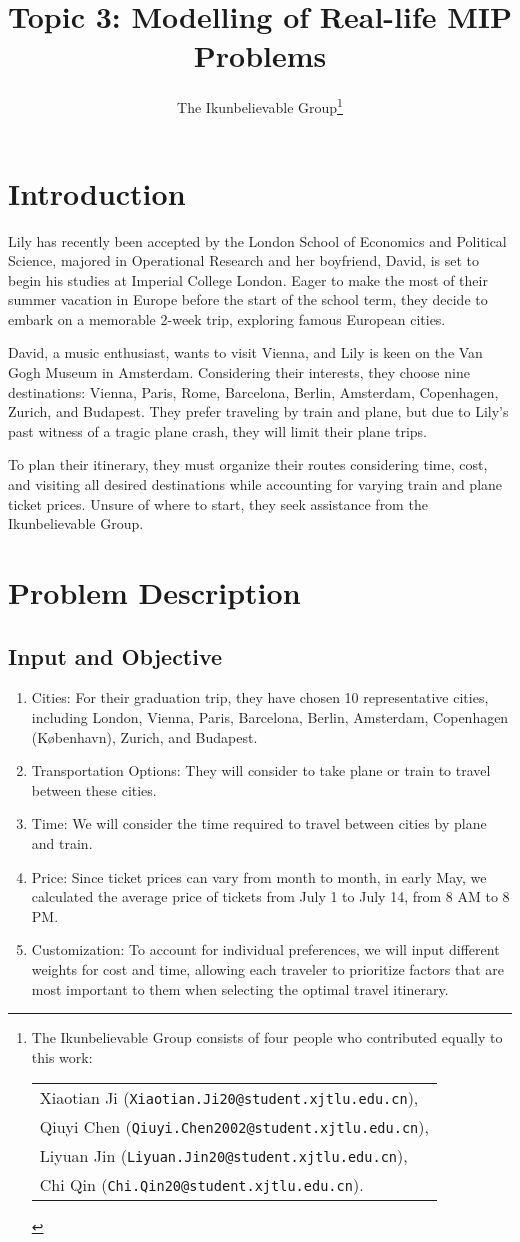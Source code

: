 \documentclass{article} %
\title{Topic 3: Modelling of Real-life MIP Problems}
\author{The Ikunbelievable Group\thanks{ The Ikunbelievable Group consists of four people who contributed equally to this work:
\begin{tabular}{@{}l}
  Xiaotian Ji (\texttt{Xiaotian.Ji20@student.xjtlu.edu.cn}), \\
  Qiuyi Chen (\texttt{Qiuyi.Chen2002@student.xjtlu.edu.cn}), \\
  Liyuan Jin (\texttt{Liyuan.Jin20@student.xjtlu.edu.cn}),   \\
  Chi Qin (\texttt{Chi.Qin20@student.xjtlu.edu.cn}).%
\end{tabular}%
}
}
\begin{document}
\maketitle
\clearpage


\tableofcontents
\clearpage
\section{Introduction}

Lily has recently been accepted by the London School of Economics
and Political Science, majored in Operational Research and her boyfriend,
David, is set to begin his studies at Imperial College London. Eager to make
the most of their summer vacation in Europe before the start of the school
term, they decide to embark on a memorable 2-week trip, exploring famous
European cities.

David, a music enthusiast, wants to visit Vienna, and Lily is keen on the Van
Gogh Museum in Amsterdam. Considering their interests, they choose nine
destinations: Vienna, Paris, Rome, Barcelona, Berlin, Amsterdam, Copenhagen,
Zurich, and Budapest. They prefer traveling by train and plane, but due to
Lily's past witness of a tragic plane crash, they will limit their plane trips.

To plan their itinerary, they must organize their routes considering time,
cost, and visiting all desired destinations while accounting for varying train
and plane ticket prices. Unsure of where to start, they seek assistance from
the Ikunbelievable Group.

\section{Problem Description}

\subsection{Input and Objective}

\begin{enumerate}
  \item Cities: For their graduation trip, they have chosen 10 representative cities,
        including London, Vienna, Paris, Barcelona, Berlin, Amsterdam, Copenhagen
        (København), Zurich, and Budapest.
  \item Transportation Options: They will consider to take plane or train to travel
        between these cities.
  \item Time: We will consider the time required to travel between cities by plane and
        train.
  \item Price: Since ticket prices can vary from month to month, in early May, we
        calculated the average price of tickets from July 1 to July 14, from 8 AM to 8 PM.\@
  \item Customization: To account for individual preferences, we will input different
        weights for cost and time, allowing each traveler to prioritize factors that
        are most important to them when selecting the optimal travel itinerary.
\end{enumerate}
\end{document}

